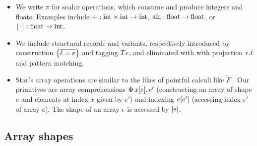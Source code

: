 \begin{itemize}
    \item We write $\pi$ for scalar operations, which consume and produce integers and floats. Examples include $+: \mathrm{int} \times \mathrm{int} \to \mathrm{int}$, $\mathrm{sin} : \mathrm{float} \to \mathrm{float}$, or $\lfloor \cdot \rfloor : \mathrm{float} \to \mathrm{int}$.
    \item We include structural records and variants, respectively introduced by construction $\srecordval{\overline{\ell = e}}$ and tagging $T\,e$, and eliminated with with projection ${e}{.}{\ell}$ and pattern matching. 
    \item Star's array operations are similar to the likes of pointful calculi like $\tilde F$ \cite{f-smooth}. Our primitives are array comprehensions $\sbuild{x}{e}{e'}$ (constructing an array of shape $e$ and elements at index $x$ given by $e'$) and indexing $\sindex{e}{e'}$ (accessing index $e'$ of array $e$).
    The shape of an array $e$ is accessed by $\sshape{e}$.
\end{itemize}

\subsection{Array shapes}
\label{subsec:array-shapes}


